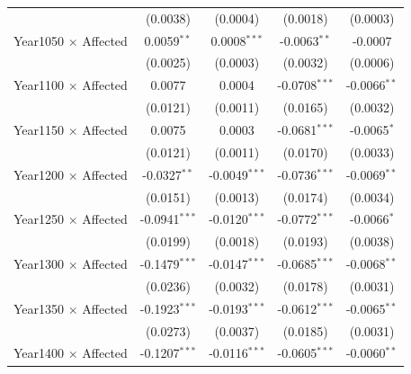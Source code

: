 \begin{table}[H]
\begin{tabular}{lcccc}
                                                    & (0.0038)        & (0.0004)        & (0.0018)              & (0.0003)\\   
   Year1050 $\times$ Affected                       & 0.0059$^{**}$   & 0.0008$^{***}$  & -0.0063$^{**}$        & -0.0007\\   
                                                    & (0.0025)        & (0.0003)        & (0.0032)              & (0.0006)\\   
   Year1100 $\times$ Affected                       & 0.0077          & 0.0004          & -0.0708$^{***}$       & -0.0066$^{**}$\\   
                                                    & (0.0121)        & (0.0011)        & (0.0165)              & (0.0032)\\   
   Year1150 $\times$ Affected                       & 0.0075          & 0.0003          & -0.0681$^{***}$       & -0.0065$^{*}$\\   
                                                    & (0.0121)        & (0.0011)        & (0.0170)              & (0.0033)\\   
   Year1200 $\times$ Affected                       & -0.0327$^{**}$  & -0.0049$^{***}$ & -0.0736$^{***}$       & -0.0069$^{**}$\\   
                                                    & (0.0151)        & (0.0013)        & (0.0174)              & (0.0034)\\   
   Year1250 $\times$ Affected                       & -0.0941$^{***}$ & -0.0120$^{***}$ & -0.0772$^{***}$       & -0.0066$^{*}$\\   
                                                    & (0.0199)        & (0.0018)        & (0.0193)              & (0.0038)\\   
   Year1300 $\times$ Affected                       & -0.1479$^{***}$ & -0.0147$^{***}$ & -0.0685$^{***}$       & -0.0068$^{**}$\\   
                                                    & (0.0236)        & (0.0032)        & (0.0178)              & (0.0031)\\   
   Year1350 $\times$ Affected                       & -0.1923$^{***}$ & -0.0193$^{***}$ & -0.0612$^{***}$       & -0.0065$^{**}$\\   
                                                    & (0.0273)        & (0.0037)        & (0.0185)              & (0.0031)\\   
   Year1400 $\times$ Affected                       & -0.1207$^{***}$ & -0.0116$^{***}$ & -0.0605$^{***}$       & -0.0060$^{**}$\\   

\end{tabular}
\end{table}
